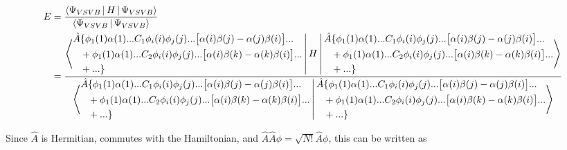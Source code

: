\documentclass[a4paper]{article}
\begin{document}
 \begin{equation}
 \begin{aligned}
     E &= \frac{    \Braket{\Psi_{VSVB}|H|\Psi_{VSVB}} }{\Braket{\Psi_{VSVB}|\Psi_{VSVB}}} \\
     &= \frac{   \Braket{   \begin{aligned} 
     \hat{A}& \{ \phi_1(1)\alpha(1)... C_1 \phi_i(i) \phi_j(j)... \big[\alpha(i)\beta(j)-\alpha(j)\beta(i)\big]... \\ &
 + \phi_1(1)\alpha(1)... C_2\phi_i(i) \phi_j(j) ...  \big[\alpha(i)\beta(k)-\alpha(k)\beta(i)\big] ... \\ &+ ...\} 
       \end{aligned}
       |H|
  \begin{aligned}
     \hat{A}& \{ \phi_1(1)\alpha(1)... C_1 \phi_i(i) \phi_j(j) ... \big[\alpha(i)\beta(j)-\alpha(j)\beta(i)\big]... \\ &
 + \phi_1(1)\alpha(1)... C_2\phi_i(i) \phi_j(j) ...  \big[\alpha(i)\beta(k)-\alpha(k)\beta(i)\big] ... \\ &+ ...\}
       \end{aligned}
         }}
       {\Braket{  \begin{aligned}
     \hat{A}& \{ \phi_1(1)\alpha(1)... C_1 \phi_i(i) \phi_j(j)... \big[\alpha(i)\beta(j)-\alpha(j)\beta(i)\big]... \\ &
 + \phi_1(1)\alpha(1)... C_2\phi_i(i) \phi_j(j) ...  \big[\alpha(i)\beta(k)-\alpha(k)\beta(i)\big] ... \\ &+ ...\} 
       \end{aligned}
              |
               \begin{aligned}
     \hat{A}& \{ \phi_1(1)\alpha(1)... C_1 \phi_i(i) \phi_j(j)... \big[\alpha(i)\beta(j)-\alpha(j)\beta(i)\big]... \\ &
 + \phi_1(1)\alpha(1)... C_2\phi_i(i) \phi_j(j) ...  \big[\alpha(i)\beta(k)-\alpha(k)\beta(i)\big] ... \\ &+ ...\} 
       \end{aligned}
       }} 
     \end{aligned}
     \end{equation}

Since $\hat{A}$ is Hermitian, commutes with the Hamiltonian, and $\hat{A}\hat{A}\phi = \sqrt{N!}\hat{A}\phi$, this can be written as
\end{document}
